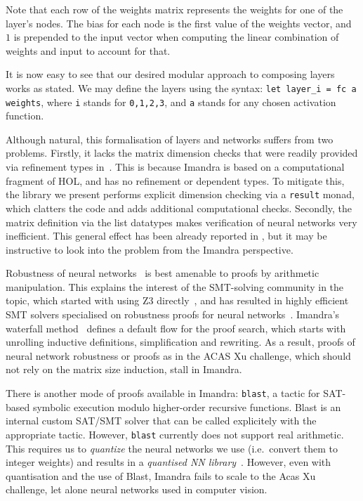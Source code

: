 \documentclass[runningheads]{llncs}
\begin{document}
Note that each row of the weights matrix
represents the weights for one of the layer's nodes. The bias for each node is
the first value of the weights vector, and $1$ is prepended to the input vector
when computing the linear combination of weights and input to account for that.



  It is now easy to see that our desired modular approach to composing layers works as stated. We may define the layers using the syntax:
  \lstinline{let layer_i = fc a weights}, where \lstinline{i} stands for \lstinline{0,1,2,3}, and \lstinline{a} stands for any chosen activation function. 

  Although natural, this formalisation of layers and networks suffers from two problems.  Firstly, it lacks the matrix dimension checks that were readily provided  via refinement types in~\cite{KokkeKKAA20}. This is because Imandra is based on a computational fragment of HOL, and has no refinement or dependent types. To mitigate this, the library we present performs explicit dimension checking via a {\tt result} monad, which clatters the code and adds additional computational checks.
  Secondly, the matrix definition via the list datatypes makes verification of neural networks very inefficient.
  This general effect has been already reported in \cite{KokkeKKAA20}, but it may be instructive to look into the problem from the Imandra perspective.

   Robustness of neural networks~\cite{CKDKKAE22} is best amenable to proofs by arithmetic manipulation. This explains the interest of the SMT-solving community in the topic, which started with using Z3 directly~\cite{HuangKWW17}, and has resulted in highly efficient SMT solvers specialised on robustness proofs for neural networks~\cite{KaBaDiJuKo17Reluplex,KatzHIJLLSTWZDK19}.   Imandra's waterfall method~\cite{PassmoreCIABKKM20} defines a default flow for the proof search, which starts with unrolling inductive definitions, simplification and rewriting.
  As a result, proofs of neural network robustness or proofs as in the ACAS Xu challenge, which should not rely on the matrix size induction,
  stall in Imandra.

  There is another mode of proofs available in Imandra:  \lstinline{blast}, a tactic for SAT-based symbolic execution modulo
 higher-order recursive functions. Blast is an internal custom SAT/SMT solver that can be called explicitely with the appropriate tactic.
 However, \lstinline{blast} currently does not support real arithmetic. This
 requires us to \emph{quantize} the neural networks we use (i.e.\ convert them to
 integer weights) and results in a \emph{quantised NN library}~\cite{DPKD22}.
 However, even with quantisation and the use of Blast, Imandra fails to scale to the Acas Xu challenge, let alone neural networks used in computer vision.
\end{document}
